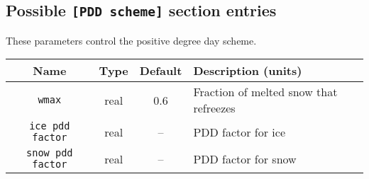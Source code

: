 \subsection{Possible \texttt{[PDD scheme]} section entries}
%
These parameters control the positive degree day scheme.
%
\begin{center}
\begin{tabular}{|c|c|c|l|}
\hline
Name & Type & Default & Description (units)\\
\hline
\texttt{wmax} & real & 0.6 & Fraction of melted snow that refreezes \\
\hline
\texttt{ice pdd factor} & real & -- & PDD factor for ice \\
\hline
\texttt{snow pdd factor} & real & -- & PDD factor for snow \\
\hline
\end{tabular}
\end{center}
%
